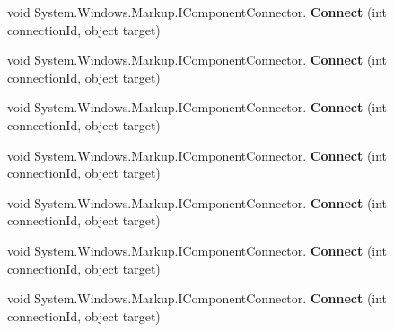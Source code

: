 \begin{DoxyCompactItemize}
\item 
\mbox{\label{class_teacher_handbook_1_1_plugins_1_1_feed_1_1_feed_a46057408648aa7e05ed3c54cb0a1cf56}} 
void System.\+Windows.\+Markup.\+I\+Component\+Connector. {\bfseries Connect} (int connection\+Id, object target)
\item 
\mbox{\label{class_teacher_handbook_1_1_plugins_1_1_feed_1_1_feed_a46057408648aa7e05ed3c54cb0a1cf56}} 
void System.\+Windows.\+Markup.\+I\+Component\+Connector. {\bfseries Connect} (int connection\+Id, object target)
\item 
\mbox{\label{class_teacher_handbook_1_1_plugins_1_1_feed_1_1_feed_a46057408648aa7e05ed3c54cb0a1cf56}} 
void System.\+Windows.\+Markup.\+I\+Component\+Connector. {\bfseries Connect} (int connection\+Id, object target)
\item 
\mbox{\label{class_teacher_handbook_1_1_plugins_1_1_feed_1_1_feed_a46057408648aa7e05ed3c54cb0a1cf56}} 
void System.\+Windows.\+Markup.\+I\+Component\+Connector. {\bfseries Connect} (int connection\+Id, object target)
\item 
\mbox{\label{class_teacher_handbook_1_1_plugins_1_1_feed_1_1_feed_a46057408648aa7e05ed3c54cb0a1cf56}} 
void System.\+Windows.\+Markup.\+I\+Component\+Connector. {\bfseries Connect} (int connection\+Id, object target)
\item 
\mbox{\label{class_teacher_handbook_1_1_plugins_1_1_feed_1_1_feed_a46057408648aa7e05ed3c54cb0a1cf56}} 
void System.\+Windows.\+Markup.\+I\+Component\+Connector. {\bfseries Connect} (int connection\+Id, object target)
\item 
\mbox{\label{class_teacher_handbook_1_1_plugins_1_1_feed_1_1_feed_a46057408648aa7e05ed3c54cb0a1cf56}} 
void System.\+Windows.\+Markup.\+I\+Component\+Connector. {\bfseries Connect} (int connection\+Id, object target)
\end{DoxyCompactItemize}
